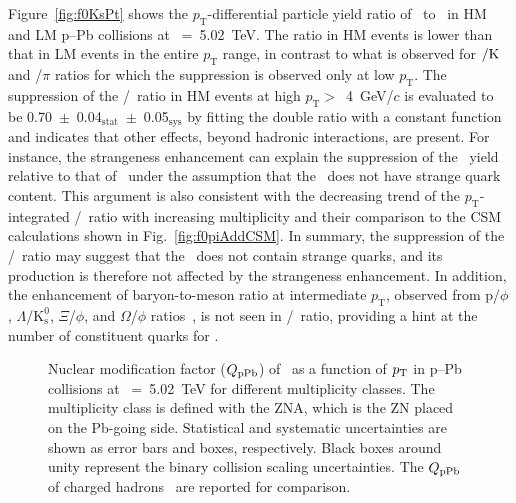 Figure~\ref{fig:f0KsPt} shows the $p_{\mathrm{T}}$-differential particle yield ratio of \fzero~to \kstar~in HM and LM p--Pb collisions at \snn~=~5.02~TeV. The ratio in HM events is lower than that in LM events in the entire $p_{\mathrm{T}}$ range, in contrast to what is observed for \kstar$\rm{}/K$ and \fzero/$\pi$ ratios for which the suppression is observed only at low $p_{\mathrm{T}}$. The suppression of the \fzero/\kstar~ratio in HM events at high $p_{\mathrm{T}}>$~4~GeV/$c$ is evaluated to be 0.70~$\pm$~0.04$_{\mathrm{stat}}$~$\pm$~0.05$_{\mathrm{sys}}$ by fitting the double ratio with a constant function and indicates that other effects, beyond hadronic interactions, are present. For instance, the strangeness enhancement can explain the suppression of the \fzero~yield relative to that of \kstar~under the assumption that the \fzero~does not have strange quark content. This argument is also consistent with the decreasing trend of the $p_{\mathrm{T}}$-integrated \fzero/\kstar~ratio with increasing multiplicity and their comparison to the CSM calculations shown in Fig.~\ref{fig:f0piAddCSM}. In summary, the suppression of the \fzero/\kstar~ratio may suggest that the \fzero~does not contain strange quarks, and its production is therefore not affected by the strangeness enhancement. In addition, the enhancement of baryon-to-meson ratio at intermediate $p_{\mathrm{T}}$, observed from p/$\phi$, $\Lambda$/$\mathrm{K}_{\mathrm{s}}^{0}$, $\Xi$/$\phi$, and $\Omega$/$\phi$ ratios~\cite{ALICE:2020jsh}, is not seen in \fzero/\kstar~ratio, providing a hint at the number of constituent quarks for \fzero.

\begin{figure}[!hbt]
	\centering
	\caption{ Nuclear modification factor ($Q_{\rm{pPb}}$) of \fzero~as a function of $p_{\rm{T}}$ in p--Pb collisions at \snn~=~5.02~TeV for different multiplicity classes. The multiplicity class is defined with the ZNA, which is the ZN placed on the Pb-going side. Statistical and systematic uncertainties are shown as error bars and boxes, respectively. Black boxes around unity represent the binary collision scaling uncertainties. The $Q_{\rm{pPb}}$ of charged hadrons~\cite{ALICE:2014xsp} are reported for comparison. }
	\label{fig:QpPb}
\end{figure}

